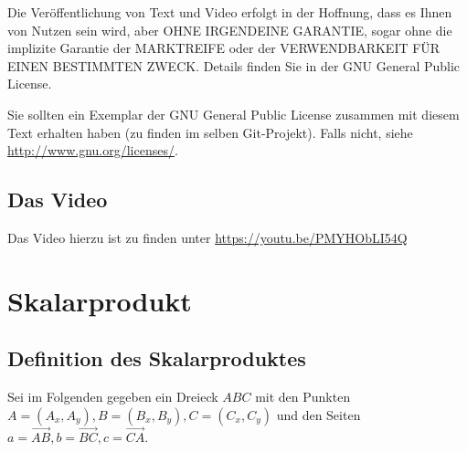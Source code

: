 \documentclass[a4paper]{amsart}
\theoremstyle{definition}
\begin{document}
Die Veröffentlichung von Text und Video erfolgt in der Hoffnung, dass es Ihnen von Nutzen sein wird, 
aber OHNE IRGENDEINE GARANTIE, sogar ohne die implizite Garantie der MARKTREIFE oder der 
VERWENDBARKEIT FÜR EINEN BESTIMMTEN ZWECK. Details finden Sie in der GNU General Public License.

Sie sollten ein Exemplar der GNU General Public License zusammen mit diesem Text erhalten haben 
(zu finden im selben Git-Projekt). 
Falls nicht, siehe \url{http://www.gnu.org/licenses/}.

\subsection*{Das Video}
Das Video hierzu ist zu finden unter 
{\tiny
   \url{https://youtu.be/PMYHObLI54Q}
}

\section{Skalarprodukt}

\subsection{Definition des Skalarproduktes}
Sei im Folgenden gegeben ein Dreieck $ABC$ mit den Punkten $A =(A_x,A_y), B =(B_x,B_y), C =(C_x,C_y)$ und den Seiten $a = \overrightarrow{AB}, b = \overrightarrow{BC}, c = \overrightarrow{CA}$.
\end{document}
